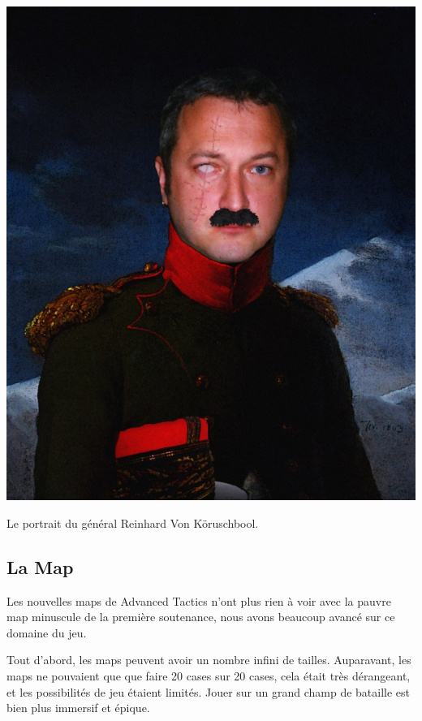 \documentclass{article}
\begin{document}
\begin{center}
\includegraphics[scale = 1]{général}
\newline
\par
Le portrait du général Reinhard Von Köruschbool.
\end{center}

\newpage

\subsection{La Map}

\par
Les nouvelles maps de Advanced Tactics n'ont plus rien à voir avec la pauvre map minuscule de la première soutenance, nous avons beaucoup avancé sur ce domaine du jeu.
\newline

\par
Tout d'abord, les maps peuvent avoir un nombre infini de tailles. Auparavant, les maps ne pouvaient que que faire 20 cases sur 20 cases, cela était très dérangeant, et les possibilités de jeu étaient limités. Jouer sur un grand champ de bataille est bien plus immersif et épique.
\newline
\end{document}
